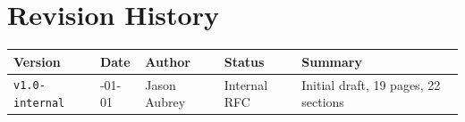\documentclass[10pt]{article}
\begin{document}
\clearpage
\printbibliography[title={References}, heading=bibnumbered]

\section{Revision History}

\renewcommand{\arraystretch}{1.15}
\setlength{\tabcolsep}{6pt}

\begin{center}
    \begin{tabularx}{\textwidth}{
        >{\raggedright\arraybackslash}p{3cm}
        >{\raggedright\arraybackslash}p{2cm}
        >{\raggedright\arraybackslash}p{3cm}
        >{\raggedright\arraybackslash}p{2cm}
        X
        }
        \rowcolor{GigaLightGrey!20}
        \textbf{Version}       & \textbf{Date} & \textbf{Author} & \textbf{Status} & \textbf{Summary}                     \\
        \midrule

        \texttt{v1.0-internal} & 2026-01-01    & Jason Aubrey    & Internal RFC    & Initial draft, 19 pages, 22 sections
    \end{tabularx}
\end{center}

\end{document}
